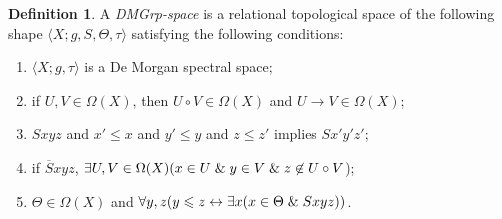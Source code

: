 \documentclass{amsart}
\theoremstyle{plain}
\theoremstyle{definition}
\newtheorem{definition}[theorem]{Definition}
\begin{document}
\begin{definition}\label{demg space}
    A \emph{DMGrp-space} is a relational topological space of the following shape $\langle X;g,S,\Theta,\tau\rangle$ satisfying the following conditions: 
    \begin{enumerate}
        \item $\langle X;g,\tau\rangle$ is a De Morgan spectral space;  
        \item if $U,V\in\Omega(X)$, then $U\circ V\in\Omega(X)$ and $U\rightarrow V\in\Omega(X)$; 
        \item $Sxyz$ and $x'\leqslant x$ and $y'\leqslant y$ and $z\leqslant z'$ implies $Sx'y'z'$; 
        \item if $\overline{S}xyz$, $\exists U,V\in\Omega(X)(x\in U\hspace{.1cm}\&\hspace{.1cm} y\in V\hspace{.1cm}\&\hspace{.1cm} z\not\in U\circ V$); 
        \item $\Theta\in\Omega(X)$ and $\forall y,z(y\leqslant z\leftrightarrow\exists x(x\in \Theta\hspace{.1cm}\&\hspace{.1cm} Sxyz))$. 
        
    \end{enumerate}
\end{definition}
\end{document}
